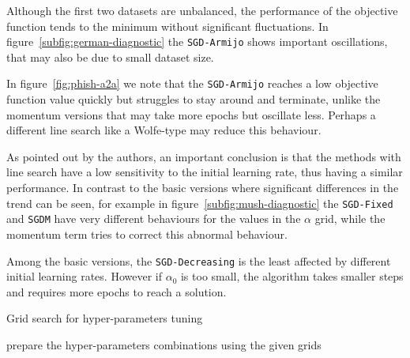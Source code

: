 Although the first two datasets are unbalanced, the performance of the objective function tends to the minimum without significant fluctuations. In figure~\ref{subfig:german-diagnostic} the \texttt{SGD-Armijo} shows important oscillations, that may also be due to small dataset size.


In figure~\ref{fig:phish-a2a} we note that the \texttt{SGD-Armijo} reaches a low objective function value quickly but struggles to stay around and terminate, unlike the momentum versions that may take more epochs but oscillate less. Perhaps a different line search like a Wolfe-type may reduce this behaviour. 

As pointed out by the authors, an important conclusion is that the methods with line search have a low sensitivity to the initial learning rate, thus having a similar performance. In contrast to the basic versions where significant differences in the trend can be seen, for example in figure~\ref{subfig:mush-diagnostic} the \texttt{SGD-Fixed} and \texttt{SGDM} have very different behaviours for the values in the $\alpha$ grid, while the momentum term tries to correct this abnormal behaviour.

Among the basic versions, the \texttt{SGD-Decreasing} is the least affected by different initial learning rates. However if $\alpha_0$ is too small, the algorithm takes smaller steps and requires more epochs to reach a solution.



\begin{algorithm}
\caption{Grid search for hyper-parameters tuning}\label{alg:grid-search}
prepare the hyper-parameters combinations using the given grids\;
\end{algorithm}

